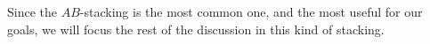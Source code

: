 


Since the $AB$-stacking is the most common one, and the most useful for our goals, we will focus the rest of the discussion in this kind of stacking.\\


